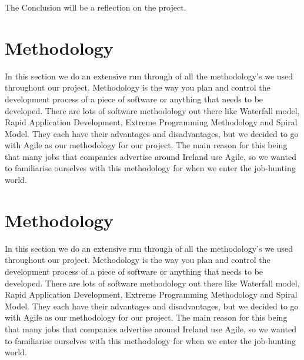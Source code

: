 The Conclusion will be a reflection on the project.

\chapter{Methodology}
In this section we do an extensive run through of all the methodology’s we used throughout our project. Methodology is the way you plan and control the development process of a piece of software or anything that needs to be developed. There are lots of software methodology out there like Waterfall model, Rapid Application Development, Extreme Programming Methodology and Spiral Model. They each have their advantages and disadvantages, but we decided to go with Agile as our methodology for our project. The main reason for this being that many jobs that companies advertise around Ireland use Agile, so we wanted to familiarise ourselves with this methodology for when we enter the job-hunting world.

\chapter{Methodology}
In this section we do an extensive run through of all the methodology’s we used throughout our project. Methodology is the way you plan and control the development process of a piece of software or anything that needs to be developed. There are lots of software methodology out there like Waterfall model, Rapid Application Development, Extreme Programming Methodology and Spiral Model. They each have their advantages and disadvantages, but we decided to go with Agile as our methodology for our project. The main reason for this being that many jobs that companies advertise around Ireland use Agile, so we wanted to familiarise ourselves with this methodology for when we enter the job-hunting world.

